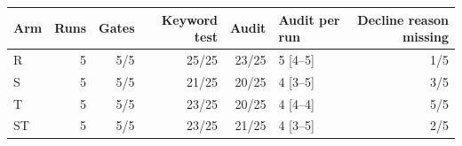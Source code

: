 \begin{tabular}{lrrrrlr}
\toprule
Arm & Runs & Gates & Keyword test & Audit & Audit per run & Decline reason missing \\
\midrule
R & 5 & 5/5 & 25/25 & 23/25 & 5 [4--5] & 1/5 \\
S & 5 & 5/5 & 21/25 & 20/25 & 4 [3--5] & 3/5 \\
T & 5 & 5/5 & 23/25 & 20/25 & 4 [4--4] & 5/5 \\
ST & 5 & 5/5 & 23/25 & 21/25 & 4 [3--5] & 2/5 \\
\bottomrule
\end{tabular}
